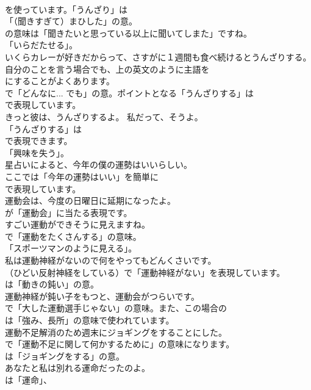 \documentclass[8pt]{extreport}
\begin{document}
\begin{CJK}{UTF8}{min}
\\	を使っています。「うんざり」は
\\	「（聞きすぎて）まひした」の意。
\\	の意味は「聞きたいと思っている以上に聞いてしまた」ですね。
\\	「いらだたせる」。	
\\	いくらカレーが好きだからって、さすがに１週間も食べ続けるとうんざりする。 
\\	自分のことを言う場合でも、上の英文のように主語を
\\	にすることがよくあります。
\\	で「どんなに... でも」の意。ポイントとなる「うんざりする」は
\\	で表現しています。	
\\	きっと彼は、うんざりするよ。 私だって、そうよ。 
\\	「うんざりする」は
\\	で表現できます。
\\	「興味を失う」。	
\\	星占いによると、今年の僕の運勢はいいらしい。 
\\	ここでは「今年の運勢はいい」を簡単に
\\	で表現しています。	
\\	運動会は、今度の日曜日に延期になったよ。 
\\	が「運動会」に当たる表現です。	
\\	すごい運動ができそうに見えますね。 
\\	で「運動をたくさんする」の意味。
\\	「スポーツマンのように見える」。	
\\	私は運動神経がないので何をやってもどんくさいです。 
\\	（ひどい反射神経をしている）で「運動神経がない」を表現しています。
\\	は「動きの鈍い」の意。	
\\	運動神経が鈍い子をもつと、運動会がつらいです。 
\\	で「大した運動選手じゃない」の意味。また、この場合の
\\	は「強み、長所」の意味で使われています。	
\\	運動不足解消のため週末にジョギングをすることにした。 
\\	で「運動不足に関して何かするために」の意味になります。
\\	は「ジョギングをする」の意。	
\\	あなたと私は別れる運命だったのよ。 
\\	は「運命」、

\end{CJK}
\end{document}
